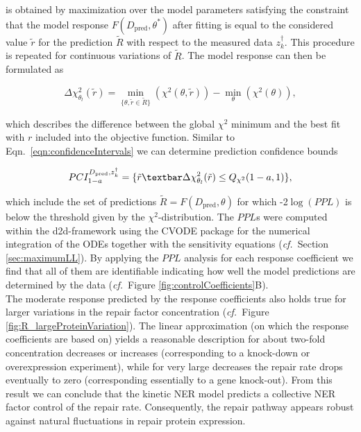 is obtained by maximization over the model parameters satisfying the constraint that the model response $F(D_\text{pred}, \theta^\ast)$ after fitting is equal to the considered value $\tilde{r}$ for the prediction $\tilde{R}$ with respect to the measured data $z_k^\dag$. This procedure is repeated for continuous variations of $\tilde{R}$. The model response can then be formulated as 

\begin{equation}
\Delta \chi_{\theta_l}^2(\tilde{r}) = \min_{\{\theta, \tilde{r} \in \tilde{R}  \}} \left( \chi^{2} (\theta,\tilde{r} )\right)
-  \min_{\theta}  \left( \chi^{2} (\theta)\right),
\end{equation}

which describes the difference between the global $\chi^{2}$ minimum and the best fit with $r$ included into the objective function. Similar to Eqn.\ \ref{eqn:confidenceIntervals} we can determine prediction confidence bounds 

\begin{equation}
PCI_{1-a}^{D_{\text{pred}},z_k^\dag} = \{\tilde{r}\textbar \Delta \chi_{\theta_l}^2(\tilde{r})\leq Q_{\chi^{2}}(1-a,1)\},
\label{eqn:confidenceIntervalsPPL}
\end{equation}

which include the set of predictions $\tilde{R} = F(D_{\text{pred}},\theta)$ for which -2$\log(PPL)$ is below the threshold given by the $\chi^{2}$-distribution. The $PPL$s were computed within the d2d-framework \cite{Raue2013} using the CVODE package \cite{Hindmarsh2005} for the numerical integration of the ODEs together with the sensitivity equations (\textit{cf.}\ Section \ref{sec:maximumLL}).
By applying the $PPL$ analysis for each response coefficient we find that all of them are identifiable indicating how well the model predictions are determined by the data (\textit{cf.}\ Figure \ref{fig:controlCoefficients}B).\\ The moderate response predicted by the response coefficients also holds true for larger variations in the repair factor concentration (\textit{cf.}\ Figure \ref{fig:R_largeProteinVariation}). The linear approximation (on which the response coefficients are based on) yields a reasonable description for about two-fold concentration decreases or increases (corresponding to a knock-down or overexpression experiment), while for very large decreases the repair rate drops eventually to zero (corresponding essentially to a gene knock-out). From this result we can conclude that the kinetic NER model predicts a collective NER factor control of the repair rate. Consequently, the repair pathway appears robust against natural fluctuations in repair protein expression.  


